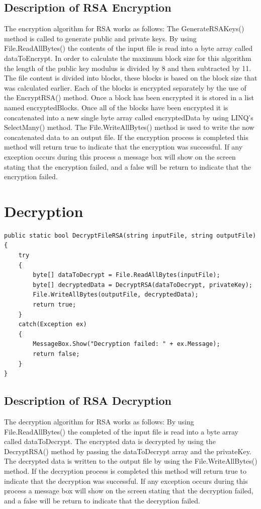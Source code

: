 \documentclass[a4paper,oneside,11pt]{book}
\begin{document}
\subsection{Description of RSA Encryption}

The encryption algorithm for RSA works as follows:
The GenerateRSAKeys() method is called to generate public and private keys. By using File.ReadAllBytes() the contents of the input file is read into a byte array called dataToEncrypt. In order to calculate the maximum block size for this algorithm the length of the public key modulus is divided by 8 and then subtracted by 11. The file content is divided into blocks, these blocks is based on the block size that was calculated earlier. Each of the blocks is encrypted separately by the use of the EncryptRSA() method. Once a block has been encrypted it is stored in a list named encryptedBlocks. Once all of the blocks have been encrypted it is concatenated into a new single byte array called encryptedData by using LINQ's SelectMany() method. The File.WriteAllBytes() method is used to write the now concatenated data to an output file. If the encryption process is completed this method will return true to indicate that the encryption was successful. If any exception occurs during this process a message box will show on the screen stating that the encryption failed, and a false will be return to indicate that the encryption failed.

\section{Decryption}
\begin{lstlisting}[language=Csh, caption={Code for RSA Decryption}]
public static bool DecryptFileRSA(string inputFile, string outputFile)
{
    try
    {
        byte[] dataToDecrypt = File.ReadAllBytes(inputFile);
        byte[] decryptedData = DecryptRSA(dataToDecrypt, privateKey);
        File.WriteAllBytes(outputFile, decryptedData);
        return true;
    }
    catch(Exception ex)
    {
        MessageBox.Show("Decryption failed: " + ex.Message);
        return false;      
    }
}
\end{lstlisting}

\pagestyle{plain}
\subsection{Description of RSA Decryption}

The decryption algorithm for RSA works as follows:
By using File.ReadAllBytes() the completed of the input file is read into a byte array called dataToDecrypt. The encrypted data is decrypted by using the DecryptRSA() method by passing the dataToDecrypt array and the privateKey. The decrypted data is written to the output file by using the File.WriteAllBytes() method. If the decryption process is completed this method will return true to indicate that the decryption was successful. If any exception occurs during this process a message box will show on the screen stating that the decryption failed, and a false will be return to indicate that the decryption failed.
\end{document}
